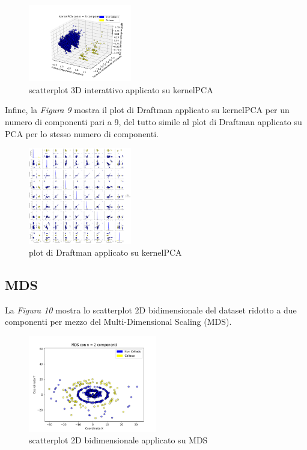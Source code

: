 \documentclass[11pt,a4paper,twocolumn]{article}
\begin{document}
	\begin{figure}[H]
		\centering
		\includegraphics[width=0.4\textwidth]{img/kernelPCA_i3D.png}
		\caption{scatterplot 3D interattivo applicato su kernelPCA}
	\end{figure}

	Infine, la \emph{Figura 9} mostra il plot di Draftman applicato su kernelPCA per un numero di componenti pari a 9, del tutto simile al plot di Draftman applicato su PCA per lo stesso numero di componenti.

	\begin{figure}[h]
		\centering
		\includegraphics[width=0.4\textwidth]{img/kernelPCA_SPLOM.png}
		\caption{plot di Draftman applicato su kernelPCA}
	\end{figure}
	
	\subsection{MDS}

	La \emph{Figura 10} mostra lo scatterplot 2D bidimensionale del dataset ridotto a due componenti per mezzo del Multi-Dimensional Scaling (MDS).

	\begin{figure}[H]
		\centering
		\includegraphics[width=0.5\textwidth]{img/MDS_2Dnc2.png}
		\caption{scatterplot 2D bidimensionale applicato su MDS}
	\end{figure}
\end{document}
